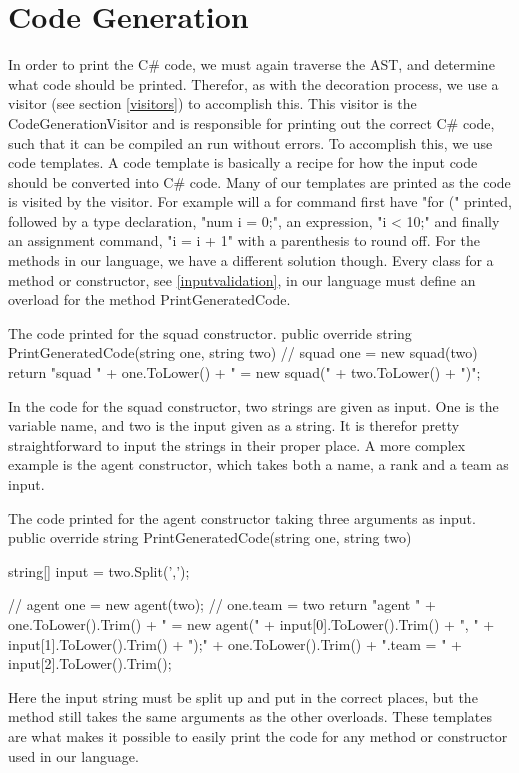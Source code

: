 \section{Code Generation}
In order to print the C\# code, we must again traverse the AST, and determine what code should be printed. 
Therefor, as with the decoration process, we use a visitor (see section \ref{visitors}) to accomplish this.
This visitor is the CodeGenerationVisitor and is responsible for printing out the correct C\# code, such that it can be compiled an run without errors. 
To accomplish this, we use code templates. \newline
A code template is basically a recipe for how the input code should be converted into C\# code. 
Many of our templates are printed as the code is visited by the visitor. 
For example will a for command first have "for (" printed, followed by a type declaration, "num i = 0;", an expression, "i < 10;" and finally an assignment command, "i = i + 1" with a parenthesis to round off. \newline
For the methods in our language, we have a different solution though. 
Every class for a method or constructor, see \ref{inputvalidation}, in our language must define an overload for the method PrintGeneratedCode. 

\begin{source}{The code printed for the squad constructor.}{}
public override string PrintGeneratedCode(string one, string two)
        {
            // squad one = new squad(two)
            return "squad " + one.ToLower() + " = new squad(" + two.ToLower() + ")";
        }
\end{source}

In the code for the squad constructor, two strings are given as input. 
One is the variable name, and two is the input given as a string. 
It is therefor pretty straightforward to input the strings in their proper place. 
A more complex example is the agent constructor, which takes both a name, a rank and a team as input.

\begin{source}{The code printed for the agent constructor taking three arguments as input.}{}
public override string PrintGeneratedCode(string one, string two)
        {
            string[] input = two.Split(',');
						
            // agent one = new agent(two);
            // one.team = two
            return "agent " + one.ToLower().Trim() + 
							" = new agent(" + input[0].ToLower().Trim() + 
							", " + input[1].ToLower().Trim() + ");\n" + 
							one.ToLower().Trim() + ".team = " + 
							input[2].ToLower().Trim();
        }
\end{source}

Here the input string must be split up and put in the correct places, but the method still takes the same arguments as the other overloads. 
These templates are what makes it possible to easily print the code for any method or constructor used in our language.